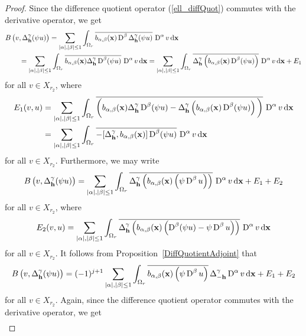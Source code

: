 \begin{proof}
Since the difference quotient operator (\ref{ell_diffQuot}) commutes
with the derivative operator, we get
\begin{align*}
&B\left(v,\Delta_{\mathbf{h}}^\gamma(\psi u)\right) =
\sum_{|\alpha|,|\beta|\leq 1}
\int_{\Omega_r} \overline{b_{\alpha,\beta}(\mathbf{x})
\operatorname{D}^\beta \Delta_{\mathbf{h}}^\gamma(\psi u)}\, \operatorname{D}^\alpha v \,\mathrm{d}{\mathbf{x}} \\
&\qquad = \sum_{|\alpha|,|\beta|\leq 1}
\int_{\Omega_r} \overline{b_{\alpha,\beta}(\mathbf{x})
\Delta_{\mathbf{h}}^\gamma \operatorname{D}^\beta (\psi u)}\, \operatorname{D}^\alpha v \,\mathrm{d}{\mathbf{x}}
= \sum_{|\alpha|,|\beta|\leq 1}
\int_{\Omega_r} \overline{
\Delta_{\mathbf{h}}^\gamma \left(b_{\alpha,\beta}(\mathbf{x})
\operatorname{D}^\beta (\psi u)\right)} \, \operatorname{D}^\alpha v \,\mathrm{d}{\mathbf{x}} + E_1
\end{align*}
for all $v \in X_{r_2}$, where
\begin{align*}
E_1(v,u) &= \sum_{|\alpha|,|\beta|\leq 1}
\int_{\Omega_r} \overline{\bigg( b_{\alpha,\beta}(\mathbf{x})
\Delta_{\mathbf{h}}^\gamma \operatorname{D}^\beta (\psi u) - 
\Delta_{\mathbf{h}}^\gamma \left(b_{\alpha,\beta}(\mathbf{x})
\operatorname{D}^\beta (\psi u)\right)\bigg)} \, \operatorname{D}^\alpha v \,\mathrm{d}{\mathbf{x}} \\
&= \sum_{|\alpha|,|\beta|\leq 1}
\int_{\Omega_r} \overline{-[\Delta_{\mathbf{h}}^\gamma,
b_{\alpha,\beta}(\mathbf{x})] \operatorname{D}^\beta (\psi u) }\, \operatorname{D}^\alpha v \,\mathrm{d}{\mathbf{x}}
\end{align*}
for all $v \in X_{r_2}$.
Furthermore, we may write
\begin{equation} \label{ell_RB_foot}
B\left(v,\Delta_{\mathbf{h}}^\gamma(\psi u)\right)
= \sum_{|\alpha|,|\beta|\leq 1}
\int_{\Omega_r} \overline{
\Delta_{\mathbf{h}}^\gamma \left(b_{\alpha,\beta}(\mathbf{x}) \left( \psi
\operatorname{D}^\beta u\right) \right)} \, \operatorname{D}^\alpha v \,\mathrm{d}{\mathbf{x}} + E_1 + E_2
\end{equation}
for all $v \in X_{r_2}$,
where
\[
E_2(v,u) = \sum_{|\alpha|,|\beta|\leq 1}
\int_{\Omega_r} \overline{
\Delta_{\mathbf{h}}^\gamma \left(b_{\alpha,\beta}(\mathbf{x})
\left(\operatorname{D}^\beta( \psi u) - \psi \operatorname{D}^\beta u\right) \right)}
\, \operatorname{D}^\alpha v \,\mathrm{d}{\mathbf{x}}
\]
for all $v \in X_{r_2}$.  It follows from Proposition~\ref{DiffQuotientAdjoint}
that
\[
B\left(v,\Delta_{\mathbf{h}}^\gamma(\psi u)\right) =
(-1)^{j+1} \sum_{|\alpha|,|\beta|\leq 1}
\int_{\Omega_r} \overline{ b_{\alpha,\beta}(\mathbf{x})
\left(\psi \operatorname{D}^\beta u\right)} \,
\Delta_{-\mathbf{h}}^\gamma \operatorname{D}^\alpha v \,\mathrm{d}{\mathbf{x}} + E_1 + E_2
\]
for all $v \in X_{r_2}$.
Again, since the difference quotient operator commutes with the
derivative operator, we get  
\begin{align*}

\end{align*}
\end{proof}
